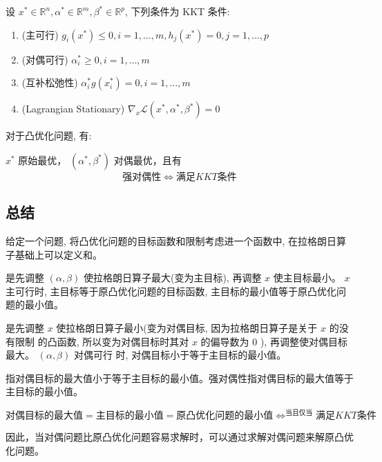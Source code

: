 \begin{theorem}
    设 $ x^{*} \in \mathbb{R}^{n}, \alpha^{*} \in \mathbb{R}^{m}, \beta^{*} \in \mathbb{R}^{p} $, 下列条件为 $ \mathrm{KKT} $ 条件:

    \begin{enumerate}
        \item (主可行) $ g_{i}\left(x^{*}\right) \leqslant 0, i=1, \ldots, m, h_{j}\left(x^{*}\right)=0, j=1, \ldots, p $
        \item (对偶可行) $ \alpha_{i}^{*} \geqslant 0, i=1, \ldots, m $
        \item (互补松弛性) $ \alpha_{i}^{*} g\left(x_{i}^{*}\right)=0, i=1, \ldots, m $
        \item (Lagrangian Stationary) $ \nabla_{x} \mathcal{L}\left(x^{*}, \alpha^{*}, \beta^{*}\right)=0 $
    \end{enumerate}

\end{theorem}

\begin{theorem}
    对于凸优化问题, 有:

$ x^{*} $ 原始最优， $ \left(\alpha^{*}, \beta^{*}\right) $ 对偶最优，且有$$ 强对偶性 \Leftrightarrow  满足  K K T  条件$$
\end{theorem}

\subsection{总结}


给定一个问题, 将凸优化问题的目标函数和限制考虑进一个函数中, 在拉格朗日算子基础上可以定义和。

是先调整 $ (\alpha, \beta) $ 使拉格朗日算子最大(变为主目标), 再调整 $ x $ 使主目标最小。 $ x $ 主可行时, 主目标等于原凸优化问题的目标函数, 主目标的最小值等于原凸优化问题的最小值。

是先调整 $ x $ 使拉格朗日算子最小(变为对偶目标, 因为拉格朗日算子是关于 $ x $ 的没有限制 的凸函数, 所以变为对偶目标时其对 $ x $ 的偏导数为 0 ), 再调整使对偶目标最大。 $ (\alpha, \beta) $ 对偶可行 时, 对偶目标小于等于主目标的最小值。

指对偶目标的最大值小于等于主目标的最小值。强对偶性指对偶目标的最大值等于主目标的最小值。

$$对偶目标的最大值=主目标的最小值=原凸优化问题的最小值 \Leftrightarrow^{当且仅当}满足KKT条件$$

因此，当对偶问题比原凸优化问题容易求解时，可以通过求解对偶问题来解原凸优化问题。
